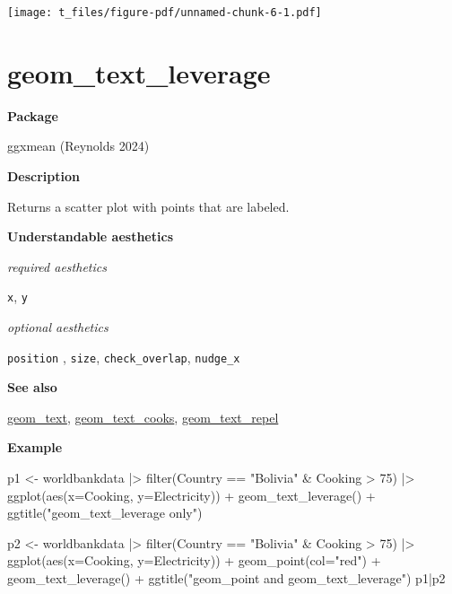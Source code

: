 \documentclass[
  letterpaper,
  DIV=11,
  numbers=noendperiod]{scrreprt}
\newenvironment{Shaded}{\begin{snugshade}}{\end{snugshade}}
\newcommand{\AttributeTok}[1]{\textcolor[rgb]{0.40,0.45,0.13}{#1}}
\newcommand{\DecValTok}[1]{\textcolor[rgb]{0.68,0.00,0.00}{#1}}
\newcommand{\FunctionTok}[1]{\textcolor[rgb]{0.28,0.35,0.67}{#1}}
\newcommand{\NormalTok}[1]{\textcolor[rgb]{0.00,0.23,0.31}{#1}}
\newcommand{\OtherTok}[1]{\textcolor[rgb]{0.00,0.23,0.31}{#1}}
\newcommand{\SpecialCharTok}[1]{\textcolor[rgb]{0.37,0.37,0.37}{#1}}
\newcommand{\StringTok}[1]{\textcolor[rgb]{0.13,0.47,0.30}{#1}}
\begin{document}
\texttt{[image: t\_files/figure-pdf/unnamed-chunk-6-1.pdf]}

\section{geom\_text\_leverage}\label{text_leverage}

\textbf{Package}

ggxmean (Reynolds 2024)

\textbf{Description}

Returns a scatter plot with points that are labeled.

\textbf{Understandable aesthetics}

\emph{required aesthetics}

\texttt{x}, \texttt{y}

\emph{optional aesthetics}

\texttt{position} , \texttt{size}, \texttt{check\_overlap},
\texttt{nudge\_x}

\textbf{See also}

\hyperref[text]{geom\_text}, \hyperref[text_cooks]{geom\_text\_cooks},
\hyperref[text_repel]{geom\_text\_repel}

\textbf{Example}

\begin{Shaded}
\begin{Highlighting}[]
\NormalTok{p1 }\OtherTok{\textless{}{-}}\NormalTok{ worldbankdata }\SpecialCharTok{|\textgreater{}}
  \FunctionTok{filter}\NormalTok{(Country }\SpecialCharTok{==} \StringTok{"Bolivia"} \SpecialCharTok{\&}\NormalTok{ Cooking }\SpecialCharTok{\textgreater{}} \DecValTok{75}\NormalTok{) }\SpecialCharTok{|\textgreater{}}
  \FunctionTok{ggplot}\NormalTok{(}\FunctionTok{aes}\NormalTok{(}\AttributeTok{x=}\NormalTok{Cooking, }\AttributeTok{y=}\NormalTok{Electricity)) }\SpecialCharTok{+} 
  \FunctionTok{geom\_text\_leverage}\NormalTok{() }\SpecialCharTok{+}
  \FunctionTok{ggtitle}\NormalTok{(}\StringTok{"geom\_text\_leverage only"}\NormalTok{)}

\NormalTok{p2 }\OtherTok{\textless{}{-}}\NormalTok{ worldbankdata }\SpecialCharTok{|\textgreater{}}
  \FunctionTok{filter}\NormalTok{(Country }\SpecialCharTok{==} \StringTok{"Bolivia"} \SpecialCharTok{\&}\NormalTok{ Cooking }\SpecialCharTok{\textgreater{}} \DecValTok{75}\NormalTok{) }\SpecialCharTok{|\textgreater{}}
  \FunctionTok{ggplot}\NormalTok{(}\FunctionTok{aes}\NormalTok{(}\AttributeTok{x=}\NormalTok{Cooking, }\AttributeTok{y=}\NormalTok{Electricity)) }\SpecialCharTok{+} 
  \FunctionTok{geom\_point}\NormalTok{(}\AttributeTok{col=}\StringTok{"red"}\NormalTok{) }\SpecialCharTok{+}
  \FunctionTok{geom\_text\_leverage}\NormalTok{() }\SpecialCharTok{+}
  \FunctionTok{ggtitle}\NormalTok{(}\StringTok{"geom\_point and geom\_text\_leverage"}\NormalTok{)}
\NormalTok{p1}\SpecialCharTok{|}\NormalTok{p2}
\end{Highlighting}
\end{Shaded}
\end{document}
